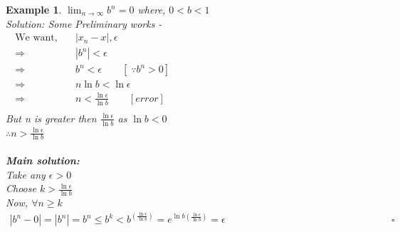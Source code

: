 \documentclass{article}
\newtheorem{example}{Example}[section]
\newcommand{\Rw}{\Rightarrow}
\newcommand{\hs}{\hspace}
\begin{document}
\begin{example}
    $\lim_{n\to\infty}b^n=0$ \qquad where, $0<b<1$\\
    \textit{Solution:} Some Preliminary works - \\
    \begin{align*}
        \text{We want,}\quad & |x_n-x|,\epsilon    \hs{10cm}            \\
        \Rw\;                & |b^n|<\epsilon                           \\
        \Rw\;                & b^n<\epsilon\qquad[\;\because b^n>0]     \\
        \Rw\;                & n \ln b < \ln\epsilon                    \\
        \Rw\;                & n<\frac{\ln\epsilon}{\ln b}\qquad[error] \\
    \end{align*}
    But n is greater then $\displaystyle\frac{\ln\epsilon}{\ln b}$ as $\ln b <0$\\
    $\displaystyle\therefore n>\frac{\ln\epsilon}{\ln b} $\\\\
    \textbf{\large Main solution:}\\
    Take any $\epsilon>0$\\
    Choose $\displaystyle k>\frac{\ln \epsilon}{\ln b}$\\
    Now, $\forall n \geq k$
    \begin{align*}
        |b^n-0|=|b^n|=b^n\leq b^k
        <b^{\displaystyle (\frac{\ln \epsilon}{\ln b})}
        =e^{\displaystyle \ln b (\frac{\ln \epsilon}{\ln b})}=\epsilon  \hs{7cm}\square
    \end{align*}
\end{example}
\end{document}
